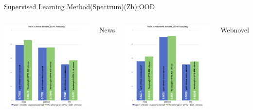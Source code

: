 \documentclass[serif]{beamer}
\begin{document}
\begin{frame}{Supervised Learning Method(Spectrum)(Zh):OOD}
\begin{columns}[t]
    \centering
    \includegraphics[width=\linewidth]{images/Train in news domain(Zh) nll Accuracy.png}
    \caption*{News}

    \centering
    \includegraphics[width=\linewidth]{images/Train in webnovel domain(Zh) nll Accuracy.png}
    \caption*{Webnovel}


\end{columns}
\end{frame}
\end{document}
